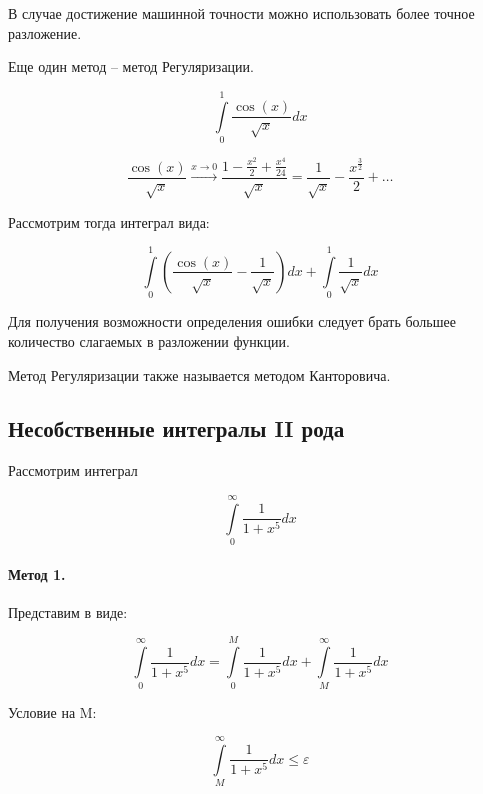 \documentclass[10pt,a4paper]{article}
\begin{document}
	В случае достижение машинной точности можно использовать более точное 
	разложение.
	
	Еще один метод -- метод Регуляризации.
	
	\begin{equation}
		\int\limits_{0}^{1}\frac{\cos\left(x\right)}{\sqrt{x}}dx
	\end{equation}
	
	\begin{equation}
		\frac{\cos\left(x\right)}{\sqrt{x}}\xrightarrow{x \to 0}
		\frac{1 - \frac{x^{2}}{2} + \frac{x^{4}}{24}}{\sqrt{x}} = 
		\frac{1}{\sqrt{x}} - \frac{x^{\frac{3}{2}}}{2} + \ldots
	\end{equation}
	
	Рассмотрим тогда интеграл вида:
	
	\begin{equation}
		\int\limits_{0}^{1}\left(\frac{\cos\left(x\right)}{\sqrt{x}}
		- \frac{1}{\sqrt{x}}\right)dx + \int\limits_{0}^{1}\frac{1}{\sqrt{x}}dx
	\end{equation}
	
	Для получения возможности определения ошибки следует брать большее 
	количество слагаемых в разложении функции.
	
	Метод Регуляризации также называется методом Канторовича.
	
	\subsection{Несобственные интегралы II рода}
	
	Рассмотрим интеграл 
	
	\begin{equation}
		\int\limits_{0}^{\infty}\frac{1}{1 + x^{5}}dx
	\end{equation}
	
	\paragraph{Метод 1.} Представим в виде:
	
	\begin{equation}
		\int\limits_{0}^{\infty}\frac{1}{1 + x^{5}}dx = 
		\int\limits_{0}^{M}\frac{1}{1 + x^{5}}dx + 
		\int\limits_{M}^{\infty}\frac{1}{1 + x^{5}}dx
	\end{equation}
	
	Условие на M:
	
	\begin{equation}
		\int\limits_{M}^{\infty}\frac{1}{1 + x^{5}}dx \leqslant \varepsilon
	\end{equation}
		
\end{document}
